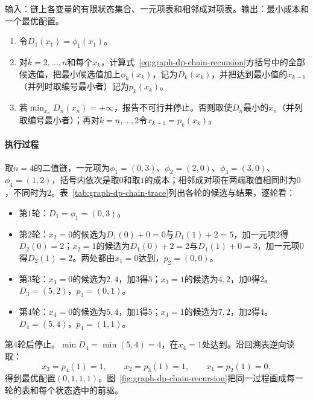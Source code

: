 \begin{algorithm}[链上的最小成本递推]
\label{alg:graph-dp-chain}
输入：链上各变量的有限状态集合、一元项表和相邻成对项表。输出：最小成本和一个最优配置。
\begin{enumerate}
  \item 令$D_1(x_1)=\phi_1(x_1)$。
  \item 对$k=2,\ldots,n$和每个$x_k$，计算式~\eqref{eq:graph-dp-chain-recursion}方括号中的全部候选值，把最小候选值加上$\phi_k(x_k)$，记为$D_k(x_k)$，并把达到最小值的$x_{k-1}$（并列时取编号最小者）记为$p_k(x_k)$。
  \item 若$\min_{x_n}D_n(x_n)=+\infty$，报告不可行并停止。否则取使$D_n$最小的$x_n$（并列取编号最小者）；再对$k=n,\ldots,2$令$x_{k-1}=p_k(x_k)$。
\end{enumerate}
\end{algorithm}

\paragraph{执行过程}
取$n=4$的二值链，一元项为$\phi_1=(0,3)$、$\phi_2=(2,0)$、$\phi_3=(3,0)$、$\phi_4=(1,2)$，括号内依次是取$0$和取$1$的成本；相邻成对项在两端取值相同时为$0$，不同时为$2$。表~\ref{tab:graph-dp-chain-trace}列出各轮的候选与结果，逐轮看：
\begin{itemize}
  \item 第$1$轮：$D_1=\phi_1=(0,3)$。
  \item 第$2$轮：$x_2=0$的候选为$D_1(0)+0=0$与$D_1(1)+2=5$，加一元项$2$得$D_2(0)=2$；$x_2=1$的候选为$D_1(0)+2=2$与$D_1(1)+0=3$，加一元项$0$得$D_2(1)=2$。两处都由$x_1=0$达到，$p_2=(0,0)$。
  \item 第$3$轮：$x_3=0$的候选为$2,4$，加$3$得$5$；$x_3=1$的候选为$4,2$，加$0$得$2$。$D_3=(5,2)$，$p_3=(0,1)$。
  \item 第$4$轮：$x_4=0$的候选为$5,4$，加$1$得$5$；$x_4=1$的候选为$7,2$，加$2$得$4$。$D_4=(5,4)$，$p_4=(1,1)$。
\end{itemize}
第$4$轮后停止。$\min D_4=\min(5,4)=4$，在$x_4=1$处达到。沿回溯表逆向读取：
\[
x_3=p_4(1)=1,\qquad x_2=p_3(1)=1,\qquad x_1=p_2(1)=0,
\]
得到最优配置$(0,1,1,1)$。图~\ref{fig:graph-dp-chain-recursion}把同一过程画成每一轮的表和每个状态选中的前驱。

